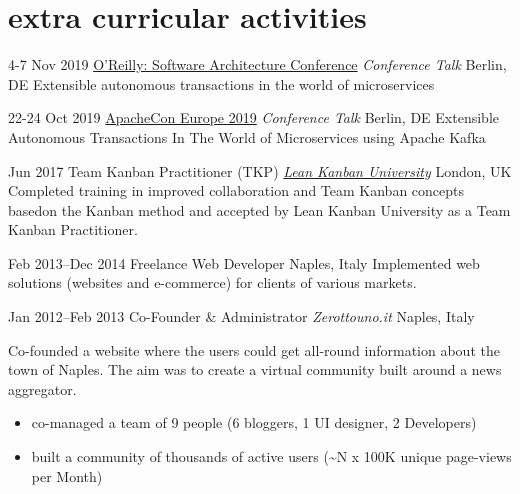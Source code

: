 \section{\normalfont extra curricular activities}
\begin{entrylist}


\entry
{4-7 Nov 2019}
{\href{https://conferences.oreilly.com/software-architecture/sa-eu/public/schedule/detail/78661
}{O'Reilly: Software Architecture Conference} {\normalfont \emph{Conference Talk}}}
{Berlin, DE}
{Extensible autonomous transactions in the world of microservices}

\entry
{22-24 Oct 2019}
{\href{https://aceu19.apachecon.com/session/extensible-autonomous-transactions-world-microservices-using-apache-kafka}{ApacheCon Europe 2019} {\normalfont \emph{Conference Talk}}}
{Berlin, DE}
{Extensible Autonomous Transactions In The World of Microservices using Apache Kafka}

\entry
{Jun 2017}
 {Team Kanban Practitioner (TKP) {\normalfont \emph{\href{https://edu.leankanban.com/}{Lean Kanban University}}}} 
{London, UK} 
{Completed training in improved  collaboration  and  Team  Kanban concepts basedon the Kanban method and accepted by Lean Kanban University as a Team Kanban Practitioner.}

\entry
{Feb 2013--Dec 2014}
{Freelance Web Developer}
{Naples, Italy}
{Implemented web solutions (websites and e-commerce) for clients of various markets.
}

\entry
{Jan 2012--Feb 2013}
{Co-Founder \& Administrator {\normalfont \emph{Zerottouno.it}}}
{Naples, Italy}
{Co-founded a website where the users could get all-round information about the town of Naples. The aim was to create a virtual community built around a news aggregator.  
\vspace{-.2cm}
\begin{itemize}[leftmargin=.6cm]
	\item co-managed a team of 9 people (6 bloggers, 1 UI designer, 2 Developers)
	\item built a community of thousands of active users (\textasciitilde N x 100K unique page-views per Month)	 
\end{itemize} 
}
\end{entrylist}